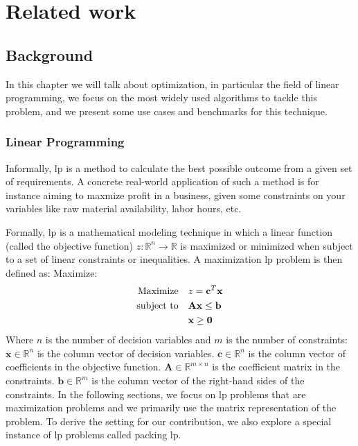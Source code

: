 
\chapter{Related work}\label{chapter:relatedwork}

\section{Background}
In this chapter we will talk about optimization, in particular the field
of linear programming, we focus on
the  most widely used algorithms to tackle this problem,
and we present some use cases and benchmarks for this technique.

\subsection{Linear Programming}
Informally, \gls{lp} is a method to calculate the best possible outcome from a given set
of requirements. A concrete real-world application of such a method is
for instance aiming to maxmize profit in a business, given some constraints on your variables
like raw material availability, labor hours, etc.

Formally, \gls{lp} is a mathematical modeling technique in which
a linear function (called the objective function) \( z: \mathbb{R}^n \to \mathbb{R} \)
is maximized or minimized when subject to a set of linear constraints or inequalities. 
A maximization \gls{lp} problem is then defined as:
Maximize:
\begin{align}
    \text{Maximize} \quad & z = \mathbf{c}^T \mathbf{x} \notag \\
    \text{subject to} \quad & \mathbf{A} \mathbf{x} \leq \mathbf{b} \notag \\
    & \mathbf{x} \geq \mathbf{0} \label{LP_Problem}
\end{align}
Where $n$ is the number of decision variables and $m$ is the number of constraints:
\(\mathbf{x} \in \mathbb{R}^n\) is the column vector of decision variables.
\(\mathbf{c} \in \mathbb{R}^n\) is the column vector of coefficients in the objective function.
\(\mathbf{A} \in \mathbb{R}^{m \times n}\) is the coefficient matrix in the constraints.
\(\mathbf{b} \in \mathbb{R}^m\) is the column vector of the right-hand sides of the constraints.
In the following sections, we focus on \gls{lp} problems that are maximization problems and we primarily
use the matrix representation of the problem.
To derive the setting for our contribution,
we also explore a special instance of \gls{lp} problems called packing \gls{lp}.

